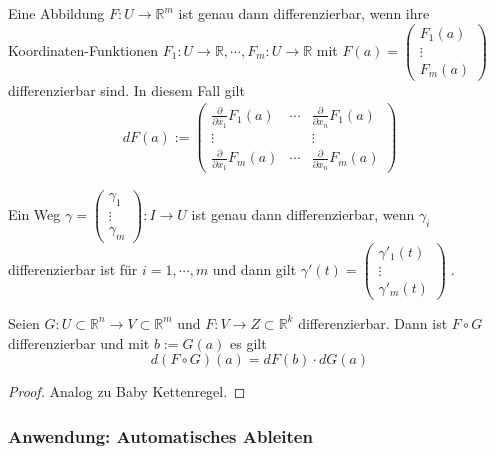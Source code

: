 \begin{Bemerkung}
Eine Abbildung $F : U \to \mathbb{R}^m$ ist genau dann  differenzierbar, wenn ihre Koordinaten-Funktionen 
$F_1 : U \to \mathbb{R},  \cdots, F_m : U \to \mathbb{R}$ mit $F(a) = \begin{pmatrix} F_1(a) \\ \vdots \\ F_m(a) \end{pmatrix}$ differenzierbar sind. In diesem Fall gilt
\begin{align*}
dF(a) :=   \begin{pmatrix}  \frac{\partial}{\partial x_1}  F_1(a) & \cdots & \frac{\partial}{\partial x_n} F_1(a) \\ 
\vdots & & \vdots \\
\frac{\partial}{\partial x_1}  F_m(a) & \cdots & \frac{\partial}{\partial x_n} F_m(a) 
\end{pmatrix}
\end{align*}
\end{Bemerkung}

\begin{Bemerkung}
Ein Weg $\gamma =  \begin{pmatrix} \gamma_1  \\ \vdots \\ \gamma_m \end{pmatrix} : I \to U$ ist genau dann differenzierbar, wenn $\gamma_i$ differenzierbar ist für $i= 1, \cdots, m$ und dann gilt $\gamma'(t) =   \begin{pmatrix} \gamma'_1(t)  \\ \vdots \\ \gamma'_m(t) \end{pmatrix} \; .$
\end{Bemerkung}



\begin{Satz}[Kettenregel]
Seien $G:  U \subset \mathbb{R}^n \to V \subset \mathbb{R}^m$ und $F: V \to Z \subset \mathbb{R}^k$ differenzierbar. Dann ist $F \circ G$ differenzierbar und mit $b := G(a)$ es gilt
$$ d(F \circ G)(a) = dF(b) \cdot dG(a) $$
\end{Satz}
\begin{proof}
Analog zu Baby Kettenregel.
\end{proof}


\subsubsection*{Anwendung: Automatisches Ableiten} 


